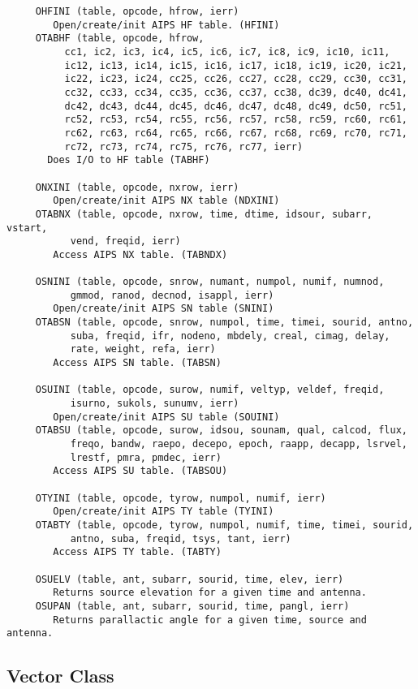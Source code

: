 {\begin{verbatim}
     OHFINI (table, opcode, hfrow, ierr)
        Open/create/init AIPS HF table. (HFINI)
     OTABHF (table, opcode, hfrow,
          cc1, ic2, ic3, ic4, ic5, ic6, ic7, ic8, ic9, ic10, ic11,
          ic12, ic13, ic14, ic15, ic16, ic17, ic18, ic19, ic20, ic21,
          ic22, ic23, ic24, cc25, cc26, cc27, cc28, cc29, cc30, cc31,
          cc32, cc33, cc34, cc35, cc36, cc37, cc38, dc39, dc40, dc41,
          dc42, dc43, dc44, dc45, dc46, dc47, dc48, dc49, dc50, rc51,
          rc52, rc53, rc54, rc55, rc56, rc57, rc58, rc59, rc60, rc61,
          rc62, rc63, rc64, rc65, rc66, rc67, rc68, rc69, rc70, rc71,
          rc72, rc73, rc74, rc75, rc76, rc77, ierr)
       Does I/O to HF table (TABHF)

     ONXINI (table, opcode, nxrow, ierr)
        Open/create/init AIPS NX table (NDXINI)
     OTABNX (table, opcode, nxrow, time, dtime, idsour, subarr, vstart,
           vend, freqid, ierr)
        Access AIPS NX table. (TABNDX)

     OSNINI (table, opcode, snrow, numant, numpol, numif, numnod,
           gmmod, ranod, decnod, isappl, ierr)
        Open/create/init AIPS SN table (SNINI)
     OTABSN (table, opcode, snrow, numpol, time, timei, sourid, antno,
           suba, freqid, ifr, nodeno, mbdely, creal, cimag, delay,
           rate, weight, refa, ierr)
        Access AIPS SN table. (TABSN)

     OSUINI (table, opcode, surow, numif, veltyp, veldef, freqid,
           isurno, sukols, sunumv, ierr)
        Open/create/init AIPS SU table (SOUINI)
     OTABSU (table, opcode, surow, idsou, sounam, qual, calcod, flux,
           freqo, bandw, raepo, decepo, epoch, raapp, decapp, lsrvel,
           lrestf, pmra, pmdec, ierr)
        Access AIPS SU table. (TABSOU)

     OTYINI (table, opcode, tyrow, numpol, numif, ierr)
        Open/create/init AIPS TY table (TYINI)
     OTABTY (table, opcode, tyrow, numpol, numif, time, timei, sourid,
           antno, suba, freqid, tsys, tant, ierr)
        Access AIPS TY table. (TABTY)

     OSUELV (table, ant, subarr, sourid, time, elev, ierr)
        Returns source elevation for a given time and antenna.
     OSUPAN (table, ant, subarr, sourid, time, pangl, ierr)
        Returns parallactic angle for a given time, source and antenna.
\end{verbatim}}

\subsection{Vector Class}


